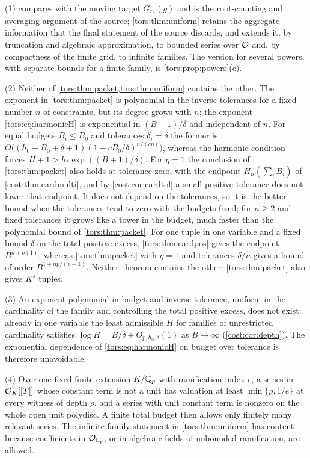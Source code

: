 \begin{remark}\label{tors:rem:tolerance}
(1)  compares with the moving target $G_{r_h}(g)$ and is the
root-counting and averaging argument of the source; \cref{tors:thm:uniform} retains the
aggregate information that the final statement of the source discards, and extends it,
by truncation and algebraic approximation, to bounded series over $\mathcal{O}$ and, by
compactness of the finite grid, to infinite families. The version for several powers,
with separate bounds for a finite family, is \cref{tors:prop:powers}(c).

(2) Neither of \cref{tors:thm:packet,tors:thm:uniform} contains the other. The exponent
in \cref{tors:thm:packet} is polynomial in the inverse tolerances for a fixed number $n$
of constraints, but its degree grows with $n$; the exponent \eqref{tors:eq:harmonicH} is
exponential in $(B+1)/\delta$ and independent of $n$. For equal budgets $B_i\le B_0$ and
tolerances $\delta_i=\delta$ the former is
$O\bigl((h_0+B_0+\delta+1)(1+cB_0/\delta)^{n/(c\eta)}\bigr)$, whereas the harmonic
condition forces $H+1>h_*\exp((B+1)/\delta)$. For $\eta=1$ the conclusion of
\cref{tors:thm:packet} also holds at tolerance zero, with the endpoint
$H_n(\sum_iB_i)$ of \cref{cost:thm:cardmulti}, and by \cref{cost:cor:cardtol} a small
positive tolerance does not lower that endpoint. It does not depend on the tolerances, so
it is the better bound when the tolerances tend to zero with the budgets fixed; for $n\ge2$
and fixed tolerances it grows like a tower in the budget, much faster than the polynomial
bound of \cref{tors:thm:packet}. For one tuple in one variable and a fixed bound $\delta$ on
the total positive excess, \cref{tors:thm:cardpos} gives the endpoint $B^{n+o(1)}$, whereas
\cref{tors:thm:packet} with $\eta=1$ and tolerances $\delta/n$ gives a bound of order
$B^{1+np/(p-1)}$. Neither theorem contains the other: \cref{tors:thm:packet}
also gives $K^s$ tuples.

(3) An exponent polynomial in budget and inverse tolerance, uniform in the cardinality of
the family and controlling the total positive excess, does not exist: already in one
variable the least admissible $H$ for families of unrestricted cardinality satisfies
$\log H=B/\delta+O_{p,h_0,\delta}(1)$ as $B\to\infty$ (\cref{cost:cor:depth}). The
exponential dependence of \eqref{tors:eq:harmonicH} on budget over tolerance is therefore
unavoidable.


(4) Over one fixed finite extension $K/\mathbb{Q}_p$ with ramification index $e$, a series in
$\mathcal{O}_K[[T]]$ whose constant term is not a unit has valuation at least
$\min\{\rho,1/e\}$ at every witness of depth $\rho$, and a series with unit constant term
is nonzero on the whole open unit polydisc. A finite total budget then allows only
finitely many relevant series. The infinite-family statement in \cref{tors:thm:uniform}
has content because coefficients in $\mathcal{O}_{\mathbb{C}_p}$, or in algebraic fields of unbounded
ramification, are allowed.
\end{remark}

